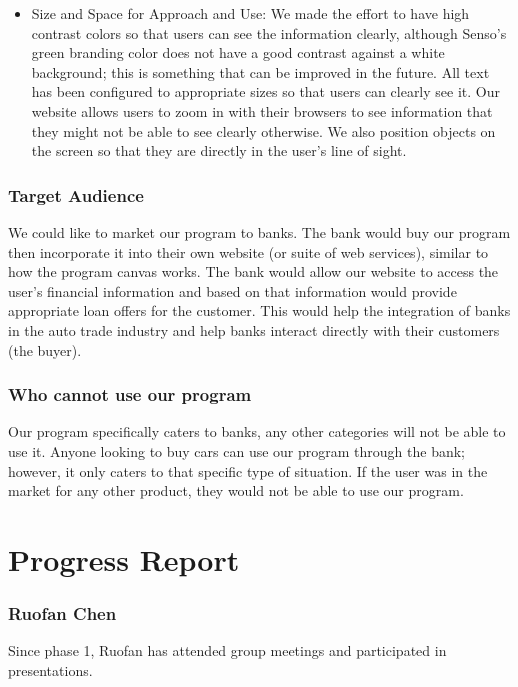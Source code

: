 \documentclass[fontsize=14pt]{article}
\begin{document}
\begin{itemize}
    \item Size and Space for Approach and Use: We made the effort to have high contrast colors so that users can see the information clearly, although Senso's green branding color does not have a good contrast against a white background; this is something that can be improved in the future. All text has been configured to appropriate sizes so that users can clearly see it. Our website allows users to zoom in with their browsers to see information that they might not be able to see clearly otherwise. We also position objects on the screen so that they are directly in the user's line of sight.
\end{itemize}

\subsubsection*{Target Audience}

We could like to market our program to banks. The bank would buy our program then incorporate it into their own website (or suite of web services), similar to how the program canvas works. The bank would allow our website to access the user's financial information and based on that information would provide appropriate loan offers for the customer. This would help the integration of banks in the auto trade industry and help banks interact directly with their customers (the buyer).

\subsubsection*{Who cannot use our program}
Our program specifically caters to banks, any other categories will not be able to use it. Anyone looking to buy cars can use our program through the bank; however, it only caters to that specific type of situation. If the user was in the market for any other product, they would not be able to use our program. 

\section*{Progress Report}


\subsubsection*{Ruofan Chen}
Since phase 1, Ruofan has attended group meetings and participated in presentations.
\end{document}
